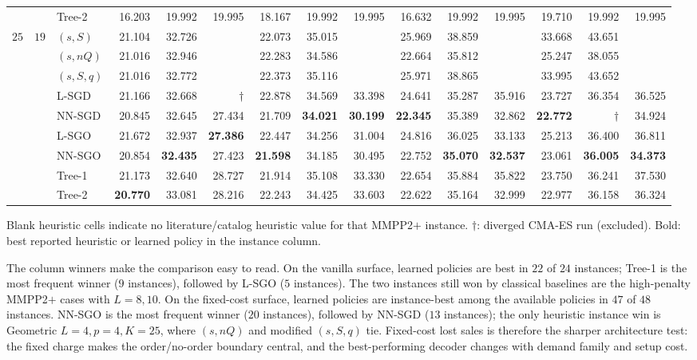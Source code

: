 \documentclass[11pt]{article}
\begin{document}
\begin{table}[!htbp]
{\begin{tabular}{lllrrrrrrrrrrrr}
 &  & Tree-2 & 16.203 & 19.992 & 19.995 & 18.167 & 19.992 & 19.995 & 16.632 & 19.992 & 19.995 & 19.710 & 19.992 & 19.995 \\
\addlinespace
$25$ & $19$ & $(s,S)$ & 21.104 & 32.726 &  & 22.073 & 35.015 &  & 25.969 & 38.859 &  & 33.668 & 43.651 &  \\
 &  & $(s,nQ)$ & 21.016 & 32.946 &  & 22.283 & 34.586 &  & 22.664 & 35.812 &  & 25.247 & 38.055 &  \\
 &  & $(s,S,q)$ & 21.016 & 32.772 &  & 22.373 & 35.116 &  & 25.971 & 38.865 &  & 33.995 & 43.652 &  \\
 &  & L-SGD & 21.166 & 32.668 & $\dagger$ & 22.878 & 34.569 & 33.398 & 24.641 & 35.287 & 35.916 & 23.727 & 36.354 & 36.525 \\
 &  & NN-SGD & 20.845 & 32.645 & 27.434 & 21.709 & \textbf{34.021} & \textbf{30.199} & \textbf{22.345} & 35.389 & 32.862 & \textbf{22.772} & $\dagger$ & 34.924 \\
 &  & L-SGO & 21.672 & 32.937 & \textbf{27.386} & 22.447 & 34.256 & 31.004 & 24.816 & 36.025 & 33.133 & 25.213 & 36.400 & 36.811 \\
 &  & NN-SGO & 20.854 & \textbf{32.435} & 27.423 & \textbf{21.598} & 34.185 & 30.495 & 22.752 & \textbf{35.070} & \textbf{32.537} & 23.061 & \textbf{36.005} & \textbf{34.373} \\
 &  & Tree-1 & 21.173 & 32.640 & 28.727 & 21.914 & 35.108 & 33.330 & 22.654 & 35.884 & 35.822 & 23.750 & 36.241 & 37.530 \\
 &  & Tree-2 & \textbf{20.770} & 33.081 & 28.216 & 22.243 & 34.425 & 33.603 & 22.622 & 35.164 & 32.999 & 22.977 & 36.158 & 36.324 \\
\bottomrule
\end{tabular}}
\par\medskip\footnotesize Blank heuristic cells indicate no literature/catalog heuristic value for that MMPP2$+$ instance. $\dagger$: diverged CMA-ES run (excluded). Bold: best reported heuristic or learned policy in the instance column.
\end{table}
\FloatBarrier

The column winners make the comparison easy to read. On the vanilla surface, learned policies are
best in $22$ of $24$ instances; Tree-1 is the most frequent winner ($9$ instances), followed by L-SGO
($5$ instances). The two instances still won by classical baselines are the high-penalty MMPP2$+$
cases with $L=8,10$. On the fixed-cost surface, learned policies are instance-best among the
available policies in $47$ of $48$ instances. NN-SGO is the most frequent winner ($20$ instances),
followed by NN-SGD ($13$ instances); the only heuristic instance win is Geometric $L=4,p=4,K=25$,
where $(s,nQ)$ and modified $(s,S,q)$ tie. Fixed-cost
lost sales is therefore the sharper architecture test: the fixed charge makes the order/no-order
boundary central, and the best-performing decoder changes with demand family and setup cost.
\end{document}
